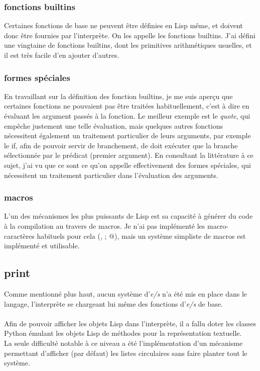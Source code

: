 \documentclass{article}
\begin{document}
\subsubsection{fonctions builtins}
Certaines fonctions de base ne peuvent être définies en Lisp même, et doivent donc être fournies par
l'interprète. On les appelle les fonctions builtins. J'ai défini une vingtaine de fonctions builtins, dont
les primitives arithmétiques usuelles, et il est très facile d'en ajouter d'autres.
\subsubsection{formes spéciales}
En travaillant sur la définition des fonction builtins, je me suis aperçu que certaines fonctions ne
pouvaient pas être traitées habituellement, c'est à dire en évaluant les argument passés à la fonction.
Le meilleur exemple est le \emph{quote}, qui empêche justement une telle évaluation, mais quelques autres
fonctions nécessitent également un traitement particulier de leurs arguments, par exemple le if, afin
de pouvoir servir de branchement, de doit exécuter que la branche sélectionnée par le prédicat (premier
argument). En consultant la littérature à ce sujet, j'ai vu que ce sont ce qu'on appelle effectivement
des formes spéciales, qui nécessitent un traitement particulier dans l'évaluation des arguments.
\subsubsection{macros}
L'un des mécanismes les plus puissants de Lisp est sa capacité à générer du code à la compilation au
travers de macros. Je n'ai pas implémenté les macro-caractères habituels pour cela (, ; @), mais un
système simpliste de macros est implémenté et utilisable.
\subsection{print}
Comme mentionné plus haut, aucun système d'\emph{e/s} n'a été mis en place dans le langage, l'interprète se chargeant
lui même des fonctions d'\emph{e/s} de base.
\paragraph{}
Afin de pouvoir afficher les objets Lisp dans l'interprète, il a fallu doter les classes Python émulant les objets Lisp 
de méthodes pour la représentation textuelle.
\\
La seule difficulté notable à ce niveau a été l'implémentation d'un mécanisme permettant d'afficher (par défaut) 
les listes circulaires sans faire planter tout le système.
\end{document}
